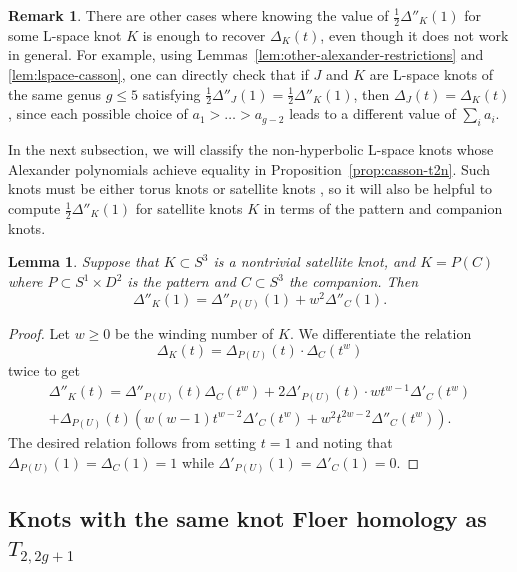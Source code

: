 \documentclass[11pt]{amsart}
\newtheorem {lemma}[theorem]{Lemma}
\numberwithin{equation}{section}
\numberwithin{theorem}{section}
\theoremstyle{definition}
\newtheorem{remark}[theorem]{Remark}
\begin{document}
\begin{remark}
There are other cases where knowing the value of $\frac{1}{2}\Delta''_K(1)$ for some L-space knot $K$ is enough to recover $\Delta_K(t)$, even though it does not work in general.  For example, using Lemmas~\ref{lem:other-alexander-restrictions} and \ref{lem:lspace-casson}, one can directly check that if $J$ and $K$ are L-space knots of the same genus $g \leq 5$ satisfying $\frac{1}{2}\Delta''_J(1) = \frac{1}{2}\Delta''_K(1)$, then $\Delta_J(t) = \Delta_K(t)$, since each possible choice of $a_1>\dots>a_{g-2}$ leads to a different value of $\sum_i a_i$.
\end{remark}

In the next subsection, we will classify the non-hyperbolic L-space knots whose Alexander polynomials achieve equality in Proposition~\ref{prop:casson-t2n}.  Such knots must be either torus knots or satellite knots \cite[Corollary~2.5]{thurston-kleinian}, so it will also be helpful to compute $\frac{1}{2}\Delta''_K(1)$ for satellite knots $K$ in terms of the pattern and companion knots.

\begin{lemma} \label{lem:casson-satellite}
Suppose that $K \subset S^3$ is a nontrivial satellite knot, and $K = P(C)$ where $P \subset S^1\times D^2$ is the pattern and $C \subset S^3$ the companion.  Then
\[ \Delta''_K(1) = \Delta''_{P(U)}(1) + w^2\Delta''_C(1). \]
\end{lemma}

\begin{proof}
Let $w \geq 0$ be the winding number of $K$.  We differentiate the relation
\[ \Delta_K(t) = \Delta_{P(U)}(t) \cdot \Delta_C(t^w) \]
twice to get
\begin{multline*}
\Delta''_K(t) = \Delta''_{P(U)}(t)\Delta_C(t^w) + 2\Delta'_{P(U)}(t) \cdot wt^{w-1}\Delta'_C(t^w) \\
+ \Delta_{P(U)}(t)\left( w(w-1)t^{w-2}\Delta'_C(t^w) + w^2t^{2w-2}\Delta''_C(t^w) \right).
\end{multline*}
The desired relation follows from setting $t=1$ and noting that $\Delta_{P(U)}(1) = \Delta_C(1) = 1$ while $\Delta'_{P(U)}(1) = \Delta'_C(1) = 0$.
\end{proof}

%
%
%

\subsection{Knots with the same knot Floer homology as $T_{2,2g+1}$}
\end{document}
